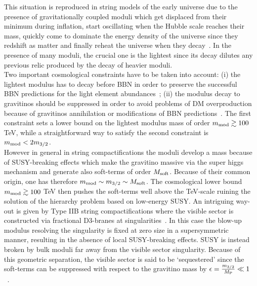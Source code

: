 \documentclass[12pt,a4paper]{book}
\begin{document}
This situation is reproduced in string models of the early universe due to the presence of gravitationally coupled moduli which get displaced from their minimum during inflation, start oscillating when the Hubble scale reaches their mass, quickly come to dominate the energy density of the universe since they redshift as matter and finally reheat the universe when they decay~\cite{Acharya:2008bk, Acharya:2009zt, Acharya:2010af, Allahverdi:2013noa}. In the presence of many moduli, the crucial one is the lightest since its decay dilutes any previous relic produced by the decay of heavier moduli.\\

Two important cosmological constraints have to be taken into account: (i) the lightest modulus has to decay before BBN in order to preserve the successful BBN predictions for the light element abundances~\cite{Coughlan:1983ci, Banks:1993en, deCarlos:1993wie}; (ii) the modulus decay to gravitinos should be suppressed in order to avoid problems of DM overproduction because of gravitinos annihilation or modifications of BBN predictions~\cite{Endo:2006zj, Nakamura:2006uc}. The first constraint sets a lower bound on the lightest modulus mass of order $m_{\rm mod} \gtrsim 100$ TeV, while a straightforward way to satisfy the second constraint is $m_{\rm mod}< 2 m_{3/2}$.\\

However in general in string compactifications the moduli develop a mass because of SUSY-breaking effects which make the gravitino massive via the super higgs mechanism and generate also soft-terms of order $M_{\rm soft}$. Because of their common origin, one has therefore $m_{\rm mod}\sim m_{3/2}\sim M_{\rm soft}$. The cosmological lower bound $m_{\rm mod}\gtrsim 100$ TeV then pushes the soft-terms well above the TeV-scale ruining the solution of the hierarchy problem based on low-energy SUSY. An intriguing way-out is given by Type IIB string compactifications where the visible sector is constructed via fractional D3-branes at singularities~\cite{Aldazabal:2000sa, Conlon:2008wa, Cicoli:2012vw, Cicoli:2013cha}. In this case the blow-up modulus resolving the singularity is fixed at zero size in a supersymmetric manner, resulting in the absence of local SUSY-breaking effects. SUSY is instead broken by bulk moduli far away from the visible sector singularity. Because of this geometric separation, the visible sector is said to be `sequestered' since the soft-terms can be suppressed with respect to the gravitino mass by $\epsilon = \frac{m_{3/2}}{M_{\rm P}}\ll 1$~\cite{Blumenhagen:2009gk}.\\
\end{document}
